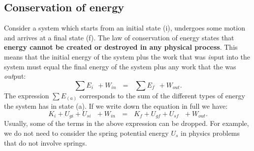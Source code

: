 \documentclass[letterpaper,9pt,journal]{IEEEtran}
\newcommand{\dokutitleleveltree}[1]{\subsection{#1}}
\newcommand{\dokubold}[1]{\textbf{#1}}
\newcommand{\dokuitalic}[1]{\textsl{#1}}
\newcommand{\be}{\begin{equation}}
\newcommand{\ee}{\end{equation}}
\begin{document}

%



%

\vspace{-3mm}
\subsection{Conservation of energy}

Consider a system which starts from an initial state (i),
undergoes some motion and arrives at a final state (f).
The law of conservation of energy states that 
\dokubold{energy cannot be created or destroyed in any physical process}.
This means that the initial energy of the system plus the work 
that was \dokuitalic{in}put into the system must equal 
the final energy of the system plus any work that the was \dokuitalic{out}put:
\be
  \sum E_{i} \ \ + W_{in} \ \ \  =  \ \ \ \sum E_{f} \ \  + W_{out}.
  \label{CONSERVATIONofENERGY}
\ee
The expression $\sum E_{(a)}$ corresponds to the sum of 
the different types of energy the system has in state (a).
If we write down the equation in full we have:
\[
 K_i + U_{gi} + U_{si} \ \ \  + W_{in}  \ \ \ = \ \ \  K_f + U_{gf} + U_{sf} \ \ \ + W_{out}.
\]
Usually, some of the terms in the above expression can be dropped.
For example, we do not need to consider the spring potential energy $U_s$
in physics problems that do not involve springs.
%


%
\end{document}
